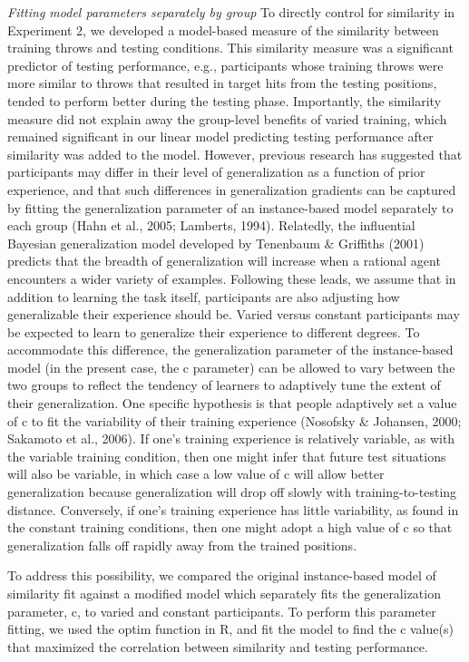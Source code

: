 \documentclass[
  jou, donotrepeattitle,floatsintext]{apa7}
\begin{document}
\emph{Fitting model parameters separately by group}
To directly control for similarity in Experiment 2, we developed a model-based measure of the similarity between training throws and testing conditions. This similarity measure was a significant predictor of testing performance, e.g., participants whose training throws were more similar to throws that resulted in target hits from the testing positions, tended to perform better during the testing phase. Importantly, the similarity measure did not explain away the group-level benefits of varied training, which remained significant in our linear model predicting testing performance after similarity was added to the model. However, previous research has suggested that participants may differ in their level of generalization as a function of prior experience, and that such differences in generalization gradients can be captured by fitting the generalization parameter of an instance-based model separately to each group (Hahn et al., 2005; Lamberts, 1994). Relatedly, the influential Bayesian generalization model developed by Tenenbaum \& Griffiths (2001) predicts that the breadth of generalization will increase when a rational agent encounters a wider variety of examples. Following these leads, we assume that in addition to learning the task itself, participants are also adjusting how generalizable their experience should be. Varied versus constant participants may be expected to learn to generalize their experience to different degrees. To accommodate this difference, the generalization parameter of the instance-based model (in the present case, the c parameter) can be allowed to vary between the two groups to reflect the tendency of learners to adaptively tune the extent of their generalization. One specific hypothesis is that people adaptively set a value of c to fit the variability of their training experience (Nosofsky \& Johansen, 2000; Sakamoto et al., 2006). If one's training experience is relatively variable, as with the variable training condition, then one might infer that future test situations will also be variable, in which case a low value of c will allow better generalization because generalization will drop off slowly with training-to-testing distance. Conversely, if one's training experience has little variability, as found in the constant training conditions, then one might adopt a high value of c so that generalization falls off rapidly away from the trained positions.

To address this possibility, we compared the original instance-based model of similarity fit against a modified model which separately fits the generalization parameter, c, to varied and constant participants. To perform this parameter fitting, we used the optim function in R, and fit the model to find the c value(s) that maximized the correlation between similarity and testing performance.
\end{document}
